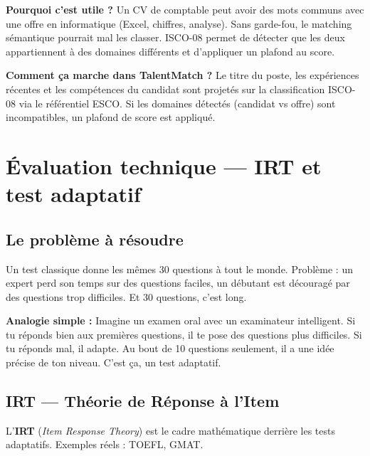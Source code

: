 \documentclass[12pt,a4paper]{article}
\newenvironment{simplification}{%
  \def\FrameCommand{\fboxsep=8pt\colorbox{green!10}}%
  \MakeFramed{\advance\hsize-\width \FrameRestore}%
  \vspace{-4pt}%
}{\endMakeFramed}
\newcommand{\concept}[1]{\textbf{\color{bleu}#1}}
\begin{document}
\begin{simplification}
\textbf{Pourquoi c'est utile ?} Un CV de comptable peut avoir des mots communs avec une offre en informatique (Excel, chiffres, analyse). Sans garde-fou, le matching sémantique pourrait mal les classer. ISCO-08 permet de détecter que les deux appartiennent à des domaines différents et d'appliquer un plafond au score.
\end{simplification}

\textbf{Comment ça marche dans TalentMatch ?} Le titre du poste, les expériences récentes et les compétences du candidat sont projetés sur la classification ISCO-08 via le référentiel ESCO. Si les domaines détectés (candidat vs offre) sont incompatibles, un plafond de score est appliqué.

\newpage

\section{Évaluation technique — IRT et test adaptatif}

\subsection{Le problème à résoudre}

Un test classique donne les mêmes 30 questions à tout le monde. Problème : un expert perd son temps sur des questions faciles, un débutant est découragé par des questions trop difficiles. Et 30 questions, c'est long.

\begin{simplification}
\textbf{Analogie simple :}
Imagine un examen oral avec un examinateur intelligent. Si tu réponds bien aux premières questions, il te pose des questions plus difficiles. Si tu réponds mal, il adapte. Au bout de 10 questions seulement, il a une idée précise de ton niveau. C'est ça, un test adaptatif.
\end{simplification}

\subsection{IRT — Théorie de Réponse à l'Item}

L'\concept{IRT} (\textit{Item Response Theory}) est le cadre mathématique derrière les tests adaptatifs. Exemples réels : TOEFL, GMAT.
\end{document}
